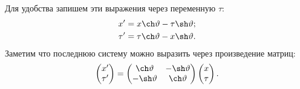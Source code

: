 Для удобства запишем эти выражения через переменную $\tau$:
\begin{align*}
    x' & = x \ch \vartheta - \tau \sh \vartheta; \\
    \tau' & = \tau \ch \vartheta - x \sh \vartheta.
\end{align*}
Заметим что последнюю систему можно выразить через произведение матриц:
\begin{equation}
	\begin{pmatrix}
		x' \\
		\tau'
	\end{pmatrix} = 
	\begin{pmatrix}
		\ch \vartheta & -\sh \vartheta \\
		-\sh \vartheta & \ch \vartheta \\ 
	\end{pmatrix}
	\begin{pmatrix}
		x \\
		\tau
	\end{pmatrix}.
\end{equation}